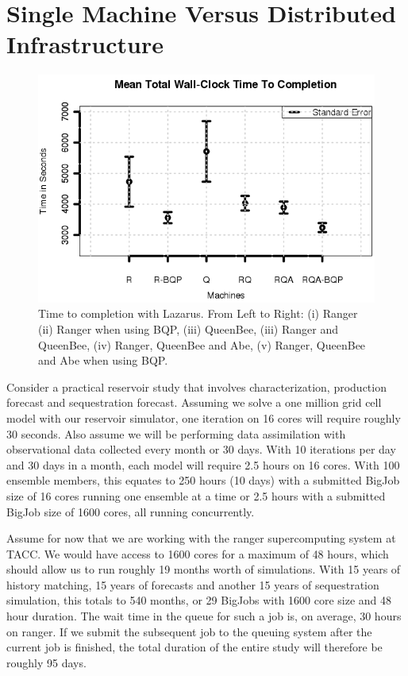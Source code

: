 \documentclass{rspublic}
\begin{document}
\section{Single Machine Versus Distributed Infrastructure}
\begin{figure}
\begin{center}
\includegraphics*[scale=0.5,angle=0]{figures/Figure7.png}
\end{center}
\caption{Time to completion with Lazarus. From Left to Right: (i)
  Ranger (ii) Ranger when using BQP, (iii) QueenBee, (iii) Ranger
  and QueenBee, (iv) Ranger, QueenBee and Abe, (v) Ranger, QueenBee 
  and Abe when using BQP.}
\label{fig:SingleVsDistributed}
\end{figure}

Consider a practical reservoir study that involves characterization, production forecast and sequestration forecast. Assuming we solve a one million grid cell model with our reservoir simulator, one iteration on 16 cores will require roughly 30 seconds. Also assume we will be performing data assimilation with observational data collected every month or 30 days. With 10 iterations per day and 30 days in a month, each model will require 2.5 hours on 16 cores. With 100 ensemble members, this equates to 250 hours (10 days) with a submitted BigJob size of 16 cores running one ensemble at a time or 2.5 hours with a submitted BigJob size of 1600 cores, all running concurrently.

Assume for now that we are working with the ranger supercomputing system at TACC. We would have access to 1600 cores for a maximum of 48 hours, which should allow us to run roughly 19 months worth of simulations. With 15 years of history matching, 15 years of forecasts and another 15 years of sequestration simulation, this totals to 540 months, or 29 BigJobs with 1600 core size and 48 hour duration. The wait time in the queue for such a job is, on average, 30 hours on ranger. If we submit the subsequent job to the queuing system after the current job is finished, the total duration of the entire study will therefore be roughly 95 days.
\end{document}
